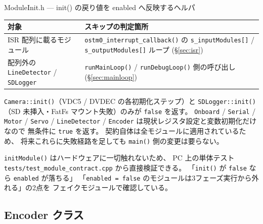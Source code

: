 \documentclass[a4paper,11pt,dvipdfmx]{jsarticle}
\begin{document}
\begin{apibox}{ModuleInit.h --- init() の戻り値を enabled へ反映するヘルパ}
\begin{tabularx}{\textwidth}{l X}
\toprule
\textbf{対象} & \textbf{スキップの判定箇所} \\
\midrule
ISR 配列に載るモジュール &
  \texttt{ostm0\_interrupt\_callback()} の \texttt{s\_inputModules[]} /
  \texttt{s\_outputModules[]} ループ (\hyperref[sec:isr]{§\ref*{sec:isr}}) \\
配列外の \texttt{LineDetector} / \texttt{SDLogger} &
  \texttt{runMainLoop()} / \texttt{runDebugLoop()} 側の呼び出し
  (\hyperref[sec:mainloop]{§\ref*{sec:mainloop}}) \\
\bottomrule
\end{tabularx}

\begin{notebox}
\texttt{Camera::init()}（VDC5 / DVDEC の各初期化ステップ）と
\texttt{SDLogger::init()}（SD 未挿入・FatFs マウント失敗）のみが \texttt{false} を返す。
\texttt{Onboard} / \texttt{Serial} / \texttt{Motor} / \texttt{Servo} /
\texttt{LineDetector} / \texttt{Encoder} は現状レジスタ設定と変数初期化だけなので
無条件に \texttt{true} を返す。
契約自体は全モジュールに適用されているため、
将来これらに失敗経路を足しても \texttt{main()} 側の変更は要らない。
\end{notebox}

\begin{notebox}[ホスト側テストで検証できる]
\texttt{initModule()} はハードウェアに一切触れないため、
PC 上の単体テスト \texttt{tests/test\_module\_contract.cpp} から直接検証できる。
「\texttt{init()} が \texttt{false} なら \texttt{enabled} が落ちる」
「\texttt{enabled = false} のモジュールは3フェーズ実行から外れる」の2点を
フェイクモジュールで確認している。
\end{notebox}

\end{apibox}

\subsection{Encoder クラス}\label{sec:api-encoder}
\end{document}
